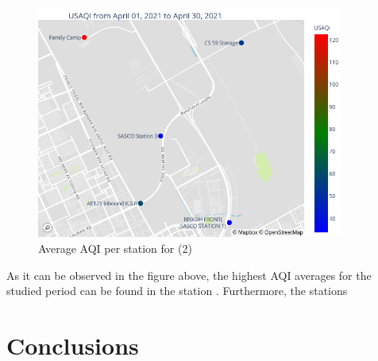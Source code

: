\documentclass[12pt, oneside]{book}
\begin{document}
{\begin{figure}[H]
\centering
\includegraphics[width=0.90\textwidth]{image23}
\caption{Average AQI per station for \monthyear (2)}\label{image23}
\end{figure}}


As it can be observed in the figure above, the highest AQI averages for the studied period can be found in the station \maxStationAQI. Furthermore, the stations \analysisAQI


\chapter{Conclusions}
\end{document}
